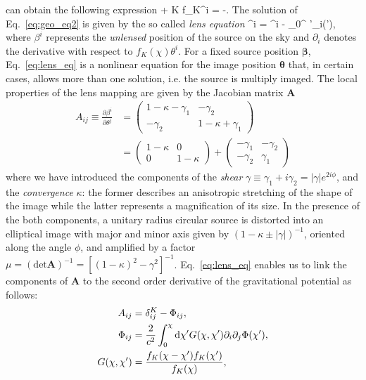 can obtain the following expression
%
\be
\label{eq:geo_eq2}
 + K f_K\theta^i = -.
\ee
%
The solution of Eq.~\eqref{eq:geo_eq2} is given by the so called \emph{lens equation}
%
\be
\label{eq:lens_eq} 
\beta^i = \theta^i - \int_0^{\chi} \diff\chi'\partial_i\Phi(\chi'),
\ee
%
where $\beta^i$ represents the \emph{unlensed} position of the source on the sky and $\partial_i$ 
denotes the derivative with respect to $f_K(\chi)\theta^i$. For a fixed source position $\bm{\beta}$, 
Eq.~\eqref{eq:lens_eq} is a nonlinear equation for the image position $\bm{\theta}$ that, in certain cases, 
allows more than one solution, i.e. the source is multiply imaged. The local properties of the lens mapping
are given by the Jacobian matrix $\mathbf{A}$
%
\begin{align}
A_{ij} \equiv  \frac{\partial \beta^i}{\partial\theta^j} &= 
 \begin{pmatrix}
  1-\kappa - \gamma_1& -\gamma_2\\
  -\gamma_2 & 1-\kappa + \gamma_1 
 \end{pmatrix}\\
 &=
\begin{pmatrix}
  1-\kappa & 0\\
  0 & 1-\kappa 
 \end{pmatrix}
+ 
\begin{pmatrix}
  -\gamma_1 & -\gamma_2\\
  -\gamma_2 & \gamma_1 
 \end{pmatrix}
\end{align}
%
where we have introduced the components of the \emph{shear} $\gamma \equiv \gamma_1 +
i\gamma_2 = |\gamma| e^{2i\phi}$, and the \emph{convergence} $\kappa$: the former describes an 
anisotropic stretching of the shape of the image while the latter represents a magnification of its size. In the 
presence of the both components, a unitary radius circular source is distorted into an elliptical image
with major and minor axis given by $(1-\kappa\pm |\gamma |)^{-1}$, oriented along the angle $\phi$, and 
amplified by a factor $\mu = (\text{det}\mathbf{A})^{-1} = [(1-\kappa)^2 - \gamma^2]^{-1}$. 
Eq.~\eqref{eq:lens_eq} enables us to link the components of $\mathbf{A}$ to the second order derivative of 
the gravitational potential as follows:
%
\begin{align}
A_{ij} &= \delta^K_{ij} - \Phi_{ij}, \\
\Phi_{ij} &= \frac{2}{c^2} \int_0^{\chi} \mathop{}\!\mathrm{d}\chi' G(\chi,\chi')\partial_i\partial_j\Phi(\chi'),\\
G(\chi,\chi') &= \frac{f_K(\chi-\chi')f_K(\chi')}{f_K(\chi)},
\end{align}
